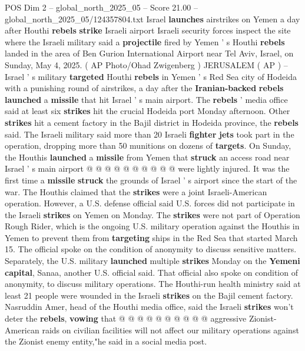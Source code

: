 \begin{textsample}{POS Dim 2 – global\_north\_2025\_05 – Score 21.00 – global\_north\_2025\_05/124357804.txt}  \label{ex:f2_pos_403}
Israel \textbf{launches} airstrikes on Yemen a day after Houthi \textbf{rebels} \textbf{strike} Israeli airport Israeli security forces inspect the site where the Israeli military said a \textbf{projectile} fired by Yemen ' s Houthi \textbf{rebels} landed in the area of Ben Gurion International Airport near Tel Aviv, Israel, on Sunday, May 4, 2025. ( AP Photo/Ohad Zwigenberg ) JERUSALEM ( AP ) -- Israel ' s military \textbf{targeted} Houthi \textbf{rebels} in Yemen ' s Red Sea city of Hodeida with a punishing round of airstrikes, a day after the \textbf{Iranian-backed} \textbf{rebels} \textbf{launched} a \textbf{missile} that hit Israel ' s main airport.
The \textbf{rebels} ' media office said at least six \textbf{strikes} hit the crucial Hodeida port Monday afternoon.
Other \textbf{strikes} hit a cement factory in the Bajil district in Hodeida province, the \textbf{rebels} said.
The Israeli military said more than 20 Israeli \textbf{fighter} \textbf{jets} took part in the operation, dropping more than 50 munitions on dozens of \textbf{targets}.
On Sunday, the Houthis \textbf{launched} a \textbf{missile} from Yemen that \textbf{struck} an access road near Israel ' s main airport @ @ @ @ @ @ @ @ @ @ were lightly injured.
It was the first time a \textbf{missile} \textbf{struck} the grounds of Israel ' s airport since the start of the war.
The Houthis claimed that the \textbf{strikes} were a joint Israeli-American operation.
However, a U.S. defense official said U.S. forces did not participate in the Israeli \textbf{strikes} on Yemen on Monday.
The \textbf{strikes} were not part of Operation Rough Rider, which is the ongoing U.S. military operation against the Houthis in Yemen to prevent them from \textbf{targeting} ships in the Red Sea that started March 15.
The official spoke on the condition of anonymity to discuss sensitive matters.
Separately, the U.S. military \textbf{launched} multiple \textbf{strikes} Monday on the \textbf{Yemeni} \textbf{capital}, Sanaa, another U.S. official said.
That official also spoke on condition of anonymity, to discuss military operations.
The Houthi-run health ministry said at least 21 people were wounded in the Israeli \textbf{strikes} on the Bajil cement factory.
Nasruddin Amer, head of the Houthi media office, said the Israeli \textbf{strikes} won't deter the \textbf{rebels}, \textbf{vowing} that @ @ @ @ @ @ @ @ @ @ aggressive Zionist-American raids on civilian facilities will not affect our military operations against the Zionist enemy entity,"he said in a social media post.

\end{textsample}
